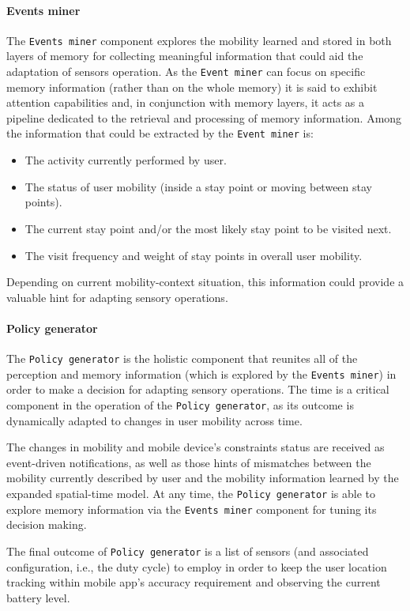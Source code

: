 \documentclass[ENG,PhD]{cinvestav}
\begin{document}
\paragraph*{Events miner}
The \texttt{Events miner} component explores the mobility learned and stored in both layers of memory for collecting meaningful information that could aid the adaptation of sensors operation.
As the \texttt{Event miner} can focus on specific memory information (rather than on the whole memory) it is said to exhibit attention capabilities and, in conjunction with memory layers, it acts as a pipeline dedicated to the retrieval and processing of memory information.
Among the information that could be extracted by the \texttt{Event miner} is:
\begin{itemize}
  \item The activity currently performed by user.
  \item The status of user mobility (inside a stay point or moving between stay points).
  \item The current stay point and/or the most likely stay point to be visited next.
  \item The visit frequency and weight of stay points in overall user mobility.
\end{itemize}
Depending on current mobility-context situation, this information could provide a valuable hint for adapting sensory operations.

\paragraph*{Policy generator}
The \texttt{Policy generator} is the holistic component that reunites all of the perception and memory information (which is explored by the \texttt{Events miner}) in order to make a decision for adapting sensory operations.
The time is a critical component in the operation of the \texttt{Policy generator}, as its outcome is dynamically adapted to changes in user mobility across time.

The changes in mobility and mobile device's constraints status are received as event-driven notifications, as well as those hints of mismatches between the mobility currently described by user and the mobility information learned by the expanded spatial-time model.
At any time, the \texttt{Policy generator} is able to explore memory information via the \texttt{Events miner} component for tuning its decision making.

The final outcome of \texttt{Policy generator} is a list of sensors (and associated configuration, i.e., the duty cycle) to employ in order to keep the user location tracking within mobile app's accuracy requirement and observing the current battery level.
\end{document}
